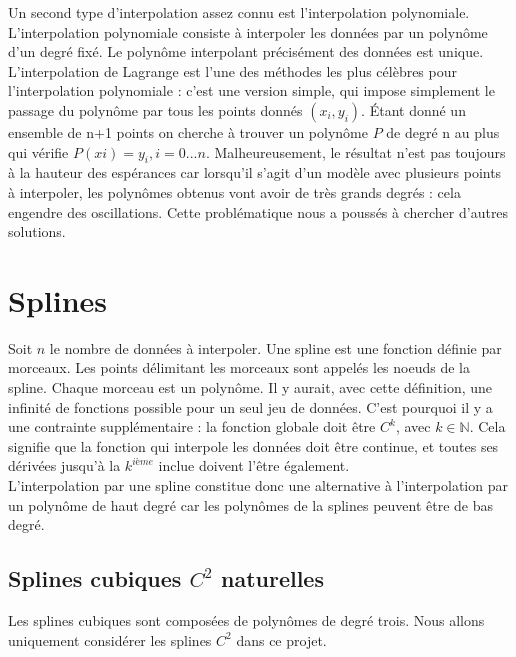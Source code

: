 \documentclass[a4paper,12pt]{article} %
\begin{document}
    Un second type d'interpolation assez connu est l'interpolation polynomiale. L'interpolation polynomiale consiste à interpoler les données par un polynôme d'un degré fixé. Le polynôme interpolant précisément des données est unique. L'interpolation de Lagrange est l'une des méthodes les plus célèbres pour l'interpolation polynomiale : c'est une version simple, qui impose simplement le passage du polynôme par tous les points donnés $(x_i,y_i)$. Étant donné un ensemble de n+1 points  on cherche à trouver un polynôme $P$ de degré n au plus qui vérifie $P(xi)=y_i  ,i=0...n$. Malheureusement, le résultat n'est pas toujours à la hauteur des espérances car lorsqu'il s'agit d'un modèle avec plusieurs points à interpoler, les polynômes obtenus vont avoir de très grands degrés : cela engendre des oscillations. Cette problématique nous a poussés à chercher d'autres solutions. 

	\section{Splines}
	    Soit $n$ le nombre de données à interpoler.
	    Une spline est une fonction définie par morceaux. Les points délimitant les morceaux sont appelés les noeuds de la spline. Chaque morceau est un polynôme. Il y aurait, avec cette définition, une infinité de fonctions possible pour un seul jeu de données. C'est pourquoi il y a une contrainte supplémentaire : la fonction globale doit être $C^k$, avec $k\in\mathbb{N}$. Cela signifie que la fonction qui interpole les données doit être continue, et toutes ses dérivées jusqu'à la $k^{ième}$ inclue doivent l'être également.\\
	    
	    L'interpolation par une spline constitue donc une alternative à l'interpolation par un polynôme de haut degré car les polynômes de la splines peuvent être de bas degré.\\
		
		\subsection{Splines cubiques $C^2$ naturelles}

            Les splines cubiques sont composées de polynômes de degré trois. Nous allons uniquement considérer les splines $C^2$ dans ce projet. \\
            
\end{document}
